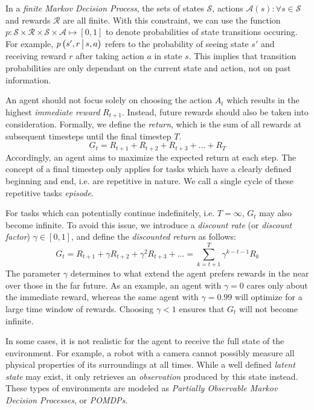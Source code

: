 In a \textit{finite Markov Decision Process}, the sets of states $\mathscr{S}$, actions $\mathscr{A}(s) : \forall s \in \mathscr{S}$ and rewards $\mathscr{R}$ are all finite. With this constraint, we can use the function $p : \mathscr{S} \times \mathscr{R} \times \mathscr{S} \times \mathscr{A} \mapsto \left[0, 1\right]$ to denote probabilities of state transitions occuring. For example, $p\left(s', r \,\middle|\, s, a\right)$ refers to the probability of seeing state $s'$ and receiving reward $r$ after taking action $a$ in state $s$. This implies that transition probabilities are only dependant on the current state and action, not on past information. \cite{bible}

An agent should not focus solely on choosing the action $A_t$ which results in the highest \textit{immediate reward} $R_{t+1}$. Instead, future rewards should also be taken into consideration. Formally, we define the \textit{return}, which is the sum of all rewards at subsequent timesteps until the final timestep $T$.
\begin{equation*}
    G_t = R_{t+1} + R_{t+2} + R_{t+3} + ... + R_T
\end{equation*}
Accordingly, an agent aims to maximize the expected return at each step. The concept of a final timestep only applies for tasks which have a clearly defined beginning and end, i.e. are repetitive in nature. We call a single cycle of these repetitive tasks \textit{episode}. \cite{bible}

For tasks which can potentially continue indefinitely, i.e. $T = \infty$, $G_t$ may also become infinite. To avoid this issue, we introduce a \textit{discount rate} (or \textit{discount factor}) $\gamma \in [0, 1]$, and define the \textit{discounted return} as follows:
\begin{equation*}
    G_t = R_{t+1} + \gamma R_{t+2} + \gamma^2 R_{t+3} + ...
        = \sum_{k=t+1}^T \gamma^{k-t-1} R_k
\end{equation*}
The parameter $\gamma$ determines to what extend the agent prefers rewards in the near over those in the far future. As an example, an agent with $\gamma = 0$ cares only about the immediate reward, whereas the same agent with $\gamma = 0.99$ will optimize for a large time window of rewards. Choosing $\gamma < 1$ ensures that $G_t$ will not become infinite. \cite{bible}

In some cases, it is not realistic for the agent to receive the full state of the environment. For example, a robot with a camera cannot possibly measure all physical properties of its surroundings at all times. While a well defined \textit{latent state} may exist, it only retrieves an \textit{observation} produced by this state instead. These types of environments are modeled as \textit{Partially Observable Markov Decision Processes}, or \textit{POMDPs}. \cite{bible}